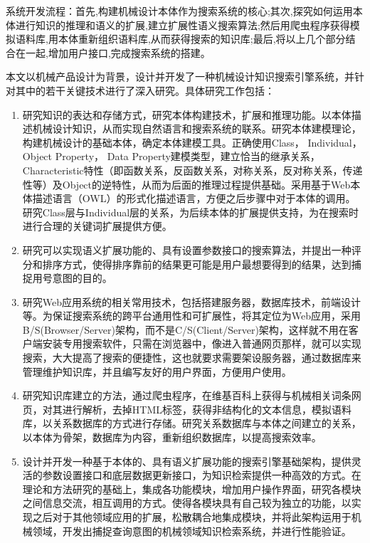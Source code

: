 \documentclass[12pt,a4paper]{article}
\begin{document}
	系统开发流程：首先,构建机械设计本体作为搜索系统的核心;其次,探究如何运用本体进行知识的推理和语义的扩展,建立扩展性语义搜索算法;然后用爬虫程序获得模拟语料库,用本体重新组织语料库,从而获得搜索的知识库;最后,将以上几个部分结合在一起,增加用户接口,完成搜索系统的搭建。

	本文以机械产品设计为背景，设计并开发了一种机械设计知识搜索引擎系统，并针对其中的若干关键技术进行了深入研究。具体研究工作包括：
	\begin{enumerate}
		\item
	研究知识的表达和存储方式，研究本体构建技术，扩展和推理功能。以本体描述机械设计知识，从而实现自然语言和搜索系统的联系。研究本体建模理论，构建机械设计的基础本体，确定本体建模工具。正确使用Class， Individual， Object Property， Data Property建模类型，建立恰当的继承关系，Characteristic特性（即函数关系，反函数关系，对称关系，反对称关系，传递性等）及Object的逆特性，从而为后面的推理过程提供基础。采用基于Web本体描述语言（OWL）的形式化描述语言，方便之后步骤中对于本体的调用。研究Class层与Individual层的关系，为后续本体的扩展提供支持，为在搜索时进行合理的关键词扩展提供方便。
		\item
	研究可以实现语义扩展功能的、具有设置参数接口的搜索算法，并提出一种评分和排序方式，使得排序靠前的结果更可能是用户最想要得到的结果，达到捕捉用号意图的目的。
		\item
	研究Web应用系统的相关常用技术，包括搭建服务器，数据库技术，前端设计等。为保证搜索系统的跨平台通用性和可扩展性，将其定位为Web应用，采用B/S(Browser/Server)架构，而不是C/S(Client/Server)架构，这样就不用在客户端安装专用搜索软件，只需在浏览器中，像进入普通网页那样，就可以实现搜索，大大提高了搜索的便捷性，这也就要求需要架设服务器，通过数据库来管理维护知识库，并且编写友好的用户界面，方便用户使用。
		\item
	研究知识库建立的方法，通过爬虫程序，在维基百科上获得与机械相关词条网页，对其进行解析，去掉HTML标签，获得非结构化的文本信息，模拟语料库，以关系数据库的方式进行存储。研究关系数据库与本体之间建立的关系，以本体为骨架，数据库为内容，重新组织数据库，以提高搜索效率。
		\item
	设计并开发一种基于本体的、具有语义扩展功能的搜索引擎基础架构，提供灵活的参数设置接口和底层数据更新接口，为知识检索提供一种高效的方式。在理论和方法研究的基础上，集成各功能模块，增加用户操作界面，研究各模块之间信息交流，相互调用的方式。使得各模块具有自己较为独立的功能，以实现之后对于其他领域应用的扩展，松散耦合地集成模块，并将此架构运用于机械领域，开发出捕捉查询意图的机械领域知识检索系统，并进行性能验证。
	\end{enumerate}
\end{document}
